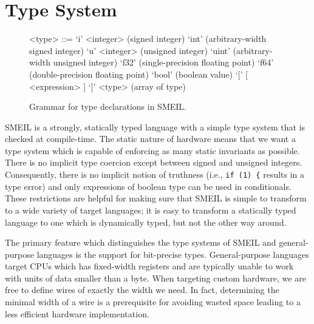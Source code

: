 
\section{Type System}
\label{sec:typesys}

\begin{figure}
\begin{grammar}
  <type> ::= `i' <integer> (signed integer)
  \alt `int' (arbitrary-width signed integer)
  \alt `u' <integer> (unsigned integer)
  \alt `uint' (arbitrary-width unsigned integer)
  \alt `f32' (single-precision floating point)
  \alt `f64' (double-precision floating point)
  \alt `bool' (boolean value)
  \alt `[' [ <expression> ] `]' <type> (array of type)
\end{grammar}
\caption{Grammar for type declarations in SMEIL.}
\label{fig:smeilgrm}
\end{figure}

SMEIL is a strongly, statically typed language with a simple type system that is
checked at compile-time. The static nature of hardware means that we want a
type system which is capable of enforcing as many static invariants as
possible. There is no implicit type coercion except between signed and unsigned
integers.
Consequently, there is no implicit notion of truthness (i.e., \texttt{if (1) \{}
results in a type error) and only expressions of boolean type can be used in
conditionals. These restrictions are helpful for making sure that SMEIL is
simple to transform to a wide variety of target languages; it is easy to
transform a statically typed language to one which is dynamically typed, but not
the other way around.

The primary feature which distinguishes the type systems of SMEIL and
general-purpose languages is the support for bit-precise types. General-purpose
languages target CPUs which has fixed-width registers and are typically unable
to work with units of data smaller than a byte. When targeting custom hardware,
we are free to define wires of exactly the width we need. In fact, determining
the minimal width of a wire is a prerequisite for avoiding wasted space leading
to a less efficient hardware implementation.

